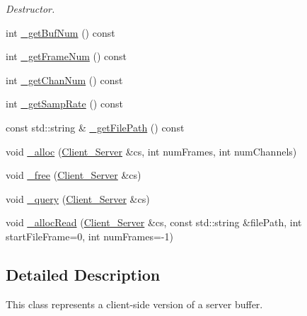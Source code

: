 \begin{DoxyCompactItemize}
\begin{DoxyCompactList}\small\item\em Destructor. \end{DoxyCompactList}\item 
int \hyperlink{classColliderPlusPlus_1_1Buffer_a6d2eb844b20eb62158d5d77bcb5d568c}{\-\_\-get\-Buf\-Num} () const 
\item 
int \hyperlink{classColliderPlusPlus_1_1Buffer_adbd84c84d0c13d9dcc96e36edce17448}{\-\_\-get\-Frame\-Num} () const 
\item 
int \hyperlink{classColliderPlusPlus_1_1Buffer_a1eca16cfed94680f3a14adcd4dfe42c9}{\-\_\-get\-Chan\-Num} () const 
\item 
int \hyperlink{classColliderPlusPlus_1_1Buffer_a6887218a82f341f668117cd24548921a}{\-\_\-get\-Samp\-Rate} () const 
\item 
const std\-::string \& \hyperlink{classColliderPlusPlus_1_1Buffer_a94c409839084712d7cc10fd46e520d68}{\-\_\-get\-File\-Path} () const 
\item 
void \hyperlink{classColliderPlusPlus_1_1Buffer_a2e1c0e2f38b8426a1c0d4a9e0c804b3c}{\-\_\-alloc} (\hyperlink{classColliderPlusPlus_1_1Client__Server}{Client\-\_\-\-Server} \&cs, int num\-Frames, int num\-Channels)
\item 
void \hyperlink{classColliderPlusPlus_1_1Buffer_a10acc708ea62e5d3f9ca6cf07b5c6f5b}{\-\_\-free} (\hyperlink{classColliderPlusPlus_1_1Client__Server}{Client\-\_\-\-Server} \&cs)
\item 
void \hyperlink{classColliderPlusPlus_1_1Buffer_a91e33c0cdebd0f7c9b2938412f83d48d}{\-\_\-query} (\hyperlink{classColliderPlusPlus_1_1Client__Server}{Client\-\_\-\-Server} \&cs)
\item 
void \hyperlink{classColliderPlusPlus_1_1Buffer_a8406cefb68adce591dbb6a4fb47f5c85}{\-\_\-alloc\-Read} (\hyperlink{classColliderPlusPlus_1_1Client__Server}{Client\-\_\-\-Server} \&cs, const std\-::string \&file\-Path, int start\-File\-Frame=0, int num\-Frames=-\/1)
\end{DoxyCompactItemize}


\subsection{Detailed Description}
This class represents a client-\/side version of a server buffer. 

